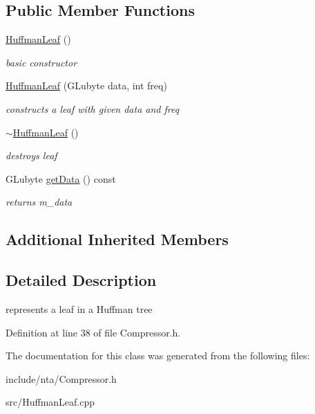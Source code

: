 \subsection*{Public Member Functions}
\begin{DoxyCompactItemize}
\item 
\mbox{\label{classnta_1_1HuffmanLeaf_afcd113b293d90d3297d409421bbfb285}} 
\hyperlink{classnta_1_1HuffmanLeaf_afcd113b293d90d3297d409421bbfb285}{Huffman\+Leaf} ()
\begin{DoxyCompactList}\small\item\em basic constructor \end{DoxyCompactList}\item 
\mbox{\label{classnta_1_1HuffmanLeaf_a68e98537fe635d83cc04a2ce70e99993}} 
\hyperlink{classnta_1_1HuffmanLeaf_a68e98537fe635d83cc04a2ce70e99993}{Huffman\+Leaf} (G\+Lubyte data, int freq)
\begin{DoxyCompactList}\small\item\em constructs a leaf with given data and freq \end{DoxyCompactList}\item 
\mbox{\label{classnta_1_1HuffmanLeaf_a579b5b814ae18f2230a07c186f96890f}} 
\hyperlink{classnta_1_1HuffmanLeaf_a579b5b814ae18f2230a07c186f96890f}{$\sim$\+Huffman\+Leaf} ()
\begin{DoxyCompactList}\small\item\em destroys leaf \end{DoxyCompactList}\item 
\mbox{\label{classnta_1_1HuffmanLeaf_aebdea9a65041b1bca7dc89a32a44d0f3}} 
G\+Lubyte \hyperlink{classnta_1_1HuffmanLeaf_aebdea9a65041b1bca7dc89a32a44d0f3}{get\+Data} () const
\begin{DoxyCompactList}\small\item\em returns m\+\_\+data \end{DoxyCompactList}\end{DoxyCompactItemize}
\subsection*{Additional Inherited Members}


\subsection{Detailed Description}
represents a leaf in a Huffman tree 

Definition at line 38 of file Compressor.\+h.



The documentation for this class was generated from the following files\+:\begin{DoxyCompactItemize}
\item 
include/nta/Compressor.\+h\item 
src/Huffman\+Leaf.\+cpp\end{DoxyCompactItemize}
